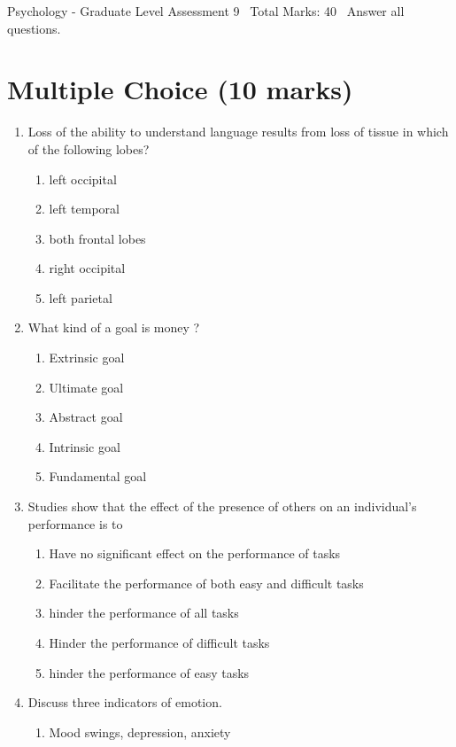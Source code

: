 \documentclass[12pt]{article}
\begin{document}
\begin{center}
Psychology - Graduate Level Assessment 9 \
Total Marks: 40 \
Answer all questions.
\end{center}

\section*{Multiple Choice (10 marks)}
\begin{enumerate}[label=\arabic*.]
\item Loss of the ability to understand language results from loss of tissue in which of the following lobes?
\begin{enumerate}[label=(\alph*)]
    \item left occipital
    \item left temporal
    \item both frontal lobes
    \item right occipital
    \item left parietal
\end{enumerate}
\item What kind of a goal is money ?
\begin{enumerate}[label=(\alph*)]
    \item Extrinsic goal
    \item Ultimate goal
    \item Abstract goal
    \item Intrinsic goal
    \item Fundamental goal
\end{enumerate}
\item Studies show that the effect of the presence of others on an individual's performance is to
\begin{enumerate}[label=(\alph*)]
    \item Have no significant effect on the performance of tasks
    \item Facilitate the performance of both easy and difficult tasks
    \item hinder the performance of all tasks
    \item Hinder the performance of difficult tasks
    \item hinder the performance of easy tasks
\end{enumerate}
\item Discuss three indicators of emotion.
\begin{enumerate}[label=(\alph*)]
    \item Mood swings, depression, anxiety

\end{enumerate}
\end{enumerate}
\end{document}
